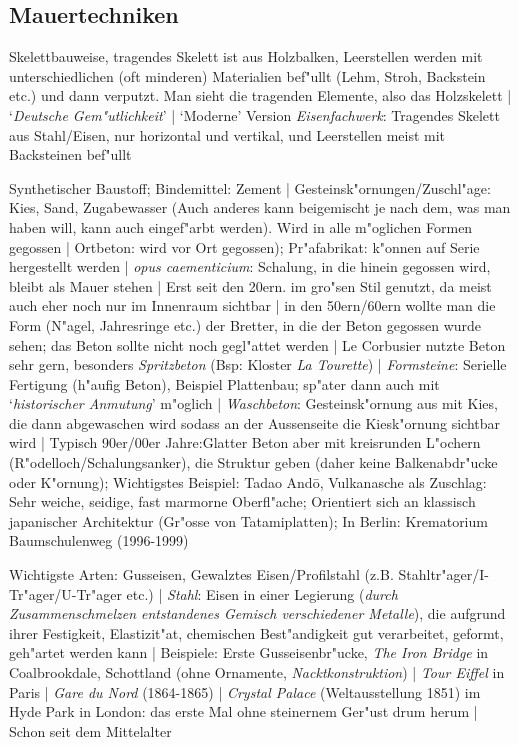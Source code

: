 \documentclass[]{scrartcl}
\begin{document}
\subsection{Mauertechniken}

\begin{description}[leftmargin=!,labelwidth=\widthof{\bfseries Fachwerk}]
  \item[Fachwerk] Skelettbauweise, tragendes Skelett ist aus Holzbalken, Leerstellen werden mit unterschiedlichen (oft minderen) Materialien bef"ullt (Lehm, Stroh, Backstein etc.) und dann verputzt. Man sieht die tragenden Elemente, also das Holzskelett | `\emph{Deutsche Gem"utlichkeit}' | `Moderne' Version \emph{Eisenfachwerk}: Tragendes Skelett aus Stahl/Eisen, nur horizontal und vertikal, und Leerstellen meist mit Backsteinen bef"ullt
  \item[Beton] Synthetischer Baustoff; Bindemittel: Zement | Gesteinsk"ornungen/Zuschl"age: Kies, Sand, Zugabewasser (Auch anderes kann beigemischt je nach dem, was man haben will, kann auch eingef"arbt werden). Wird in alle m"oglichen Formen gegossen | Ortbeton: wird vor Ort gegossen); Pr"afabrikat: k"onnen auf Serie hergestellt werden | \emph{opus caementicium}: Schalung, in die hinein gegossen wird, bleibt als Mauer stehen | Erst seit den 20ern. im gro"sen Stil genutzt, da meist auch eher noch nur im Innenraum sichtbar | in den 50ern/60ern wollte man die Form (N"agel, Jahresringe etc.) der Bretter, in die der Beton gegossen wurde sehen; das Beton sollte nicht noch gegl"attet werden | Le Corbusier nutzte Beton sehr gern, besonders \emph{Spritzbeton} (Bsp: Kloster \emph{La Tourette}) | \emph{Formsteine}: Serielle Fertigung (h"aufig Beton), Beispiel Plattenbau; sp"ater dann auch mit `\emph{historischer Anmutung}' m"oglich | \emph{Waschbeton}: Gesteinsk"ornung aus mit Kies, die dann abgewaschen wird sodass an der Aussenseite die Kiesk"ornung sichtbar wird | Typisch 90er/00er Jahre:Glatter Beton aber mit kreisrunden L"ochern (R"odelloch/Schalungsanker), die Struktur geben (daher keine Balkenabdr"ucke oder K"ornung); Wichtigstes Beispiel: Tadao Andō, Vulkanasche als Zuschlag: Sehr weiche, seidige, fast marmorne Oberfl"ache; Orientiert sich an klassisch japanischer Architektur (Gr"osse von Tatamiplatten); In Berlin: Krematorium Baumschulenweg (1996-1999)
 \item[Eisen] Wichtigste Arten: Gusseisen, Gewalztes Eisen/Profilstahl (z.B. Stahltr"ager/I-Tr"ager/U-Tr"ager etc.) | \emph{Stahl}: Eisen in einer Legierung (\emph{durch Zusammenschmelzen entstandenes Gemisch verschiedener Metalle}), die aufgrund ihrer Festigkeit, Elastizit"at, chemischen Best"andigkeit gut verarbeitet, geformt, geh"artet werden kann | Beispiele: Erste Gusseisenbr"ucke, \emph{The Iron Bridge} in Coalbrookdale, Schottland (ohne Ornamente, \emph{Nacktkonstruktion}) | \emph{Tour Eiffel} in Paris | \emph{Gare du Nord} (1864-1865) | \emph{Crystal Palace} (Weltausstellung 1851) im Hyde Park in London: das erste Mal ohne steinernem Ger"ust drum herum | Schon seit dem Mittelalter

\end{description}
\end{document}
